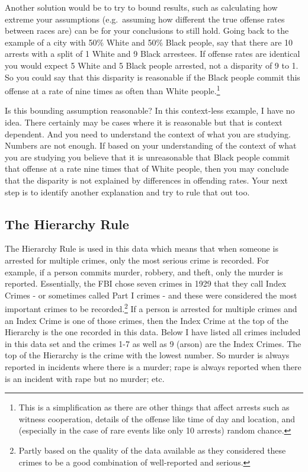 \documentclass[
]{krantz}
\begin{document}
Another solution would be to try to bound results, such as
calculating how extreme your assumptions (e.g.~assuming how
different the true offense rates between races are) can be
for your conclusions to still hold. Going back to the
example of a city with 50\% White and 50\% Black people, say
that there are 10 arrests with a split of 1 White and 9
Black arrestees. If offense rates are identical you would
expect 5 White and 5 Black people arrested, not a disparity
of 9 to 1. So you could say that this disparity is
reasonable if the Black people commit this offense at a rate
of nine times as often than White people.\footnote{This is a
  simplification as there are other things that affect
  arrests such as witness cooperation, details of the
  offense like time of day and location, and (especially in
  the case of rare events like only 10 arrests) random
  chance.}

Is this bounding assumption reasonable? In this context-less
example, I have no idea. There certainly may be cases where
it is reasonable but that is context dependent. And you need
to understand the context of what you are studying. Numbers
are not enough. If based on your understanding of the
context of what you are studying you believe that it is
unreasonable that Black people commit that offense at a rate
nine times that of White people, then you may conclude that
the disparity is not explained by differences in offending
rates. Your next step is to identify another explanation and
try to rule that out too.

\subsection{The Hierarchy Rule}\label{the-hierarchy-rule}

The Hierarchy Rule is used in this data which means that
when someone is arrested for multiple crimes, only the most
serious crime is recorded. For example, if a person commits
murder, robbery, and theft, only the murder is reported.
Essentially, the FBI chose seven crimes in 1929 that they
call Index Crimes - or sometimes called Part I crimes - and
these were considered the most important crimes to be
recorded.\footnote{Partly based on the quality of the data
  available as they considered these crimes to be a good
  combination of well-reported and serious.} If a person is
arrested for multiple crimes and an Index Crime is one of
those crimes, then the Index Crime at the top of the
Hierarchy is the one recorded in this data. Below I have
listed all crimes included in this data set and the crimes
1-7 as well as 9 (arson) are the Index Crimes. The top of
the Hierarchy is the crime with the lowest number. So murder
is always reported in incidents where there is a murder;
rape is always reported when there is an incident with rape
but no murder; etc.
\end{document}
